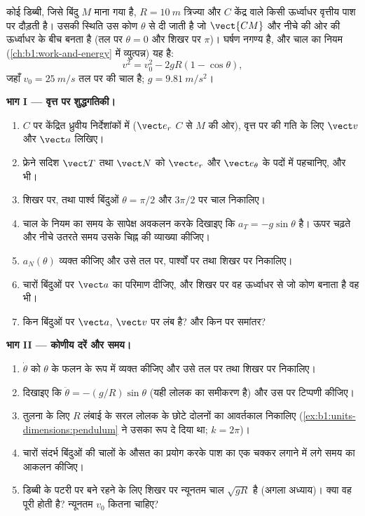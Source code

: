\begin{problem}
\label{pb:b1:point-kinematics:1}
कोई डिब्बी, जिसे बिंदु $M$ माना गया है, $R = \qty{10}{m}$ त्रिज्या और $C$
केंद्र वाले किसी ऊर्ध्वाधर वृत्तीय पाश पर दौड़ती है। उसकी स्थिति उस कोण
$\theta$ से दी जाती है जो $\vect{CM}$ और नीचे की ओर की ऊर्ध्वाधर के बीच
बनता है (तल पर $\theta =
0$ और शिखर पर $\pi$)। घर्षण नगण्य है, और चाल का नियम
(\cref{ch:b1:work-and-energy} में व्युत्पन्न) यह है:
\[
v^2 = v_0^2 - 2gR(1 - \cos\theta),
\]
जहाँ $v_0 = \qty{25}{m/s}$ तल पर की चाल है; $g = \qty{9.81}{m/s^2}$।

\medskip
\noindent\textbf{भाग I --- वृत्त पर शुद्धगतिकी।}
\begin{enumerate}
  \item $C$ पर केंद्रित ध्रुवीय निर्देशांकों में ($\vect e_r$ $C$ से $M$ की
        ओर), वृत्त पर की गति के लिए $\vect v$ और $\vect a$ लिखिए।
  \item फ्रेने सदिश $\vect T$ तथा $\vect N$ को $\vect e_r$ और
        $\vect e_\theta$ के पदों में पहचानिए, और  भी।
  \item शिखर पर, तथा पार्श्व बिंदुओं $\theta = \pi/2$ और $3\pi/2$ पर चाल
        निकालिए।
  \item चाल के नियम का समय के सापेक्ष अवकलन करके दिखाइए कि  $a_T = -g\sin\theta$ है। ऊपर चढ़ते और नीचे उतरते समय उसके
        चिह्न की व्याख्या कीजिए।
  \item {} $a_N(\theta)$ व्यक्त कीजिए और उसे तल पर, पार्श्वों पर
        तथा शिखर पर निकालिए।
  \item चारों बिंदुओं पर $\vect a$ का परिमाण दीजिए, और शिखर पर वह
        ऊर्ध्वाधर से जो कोण बनाता है वह भी।
  \item किन बिंदुओं पर $\vect a$, $\vect v$ पर लंब है? और किन पर समांतर?
\end{enumerate}

\medskip
\noindent\textbf{भाग II --- कोणीय दरें और समय।}
\begin{enumerate}[resume]
  \item $\dot\theta$ को $\theta$ के फलन के रूप में व्यक्त कीजिए और उसे तल
        पर तथा शिखर पर निकालिए।
  \item दिखाइए कि $\ddot\theta = -(g/R)\sin\theta$ (यही लोलक का समीकरण है)
        और उस पर टिप्पणी कीजिए।
  \item तुलना के लिए $R$ लंबाई के सरल लोलक के छोटे दोलनों का आवर्तकाल
        निकालिए (\cref{ex:b1:units-dimensions:pendulum} ने उसका रूप दे दिया
        था; $k = 2\pi$)।
  \item चारों संदर्भ बिंदुओं की चालों के औसत का प्रयोग करके पाश का एक चक्कर
        लगाने में लगे समय का आकलन कीजिए।
  \item डिब्बी के पटरी पर बने रहने के लिए शिखर पर न्यूनतम चाल $\sqrt{gR}$
        है (अगला अध्याय)। क्या वह पूरी होती है? न्यूनतम $v_0$ कितना चाहिए?
\end{enumerate}


\end{problem}

